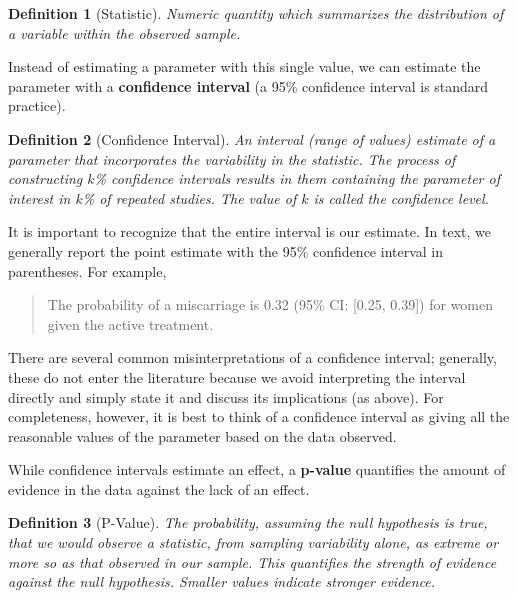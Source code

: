 \documentclass[
]{book}
\theoremstyle{plain}
\theoremstyle{mydefn}
\newtheorem{definition}{Definition}[chapter]
\theoremstyle{myexmpl}
\theoremstyle{remark}
\begin{document}
\begin{definition}[Statistic]
\protect\hypertarget{def:defn-statistic}{}{\label{def:defn-statistic} {} }Numeric quantity which summarizes the distribution of a variable within the observed \emph{sample}.
\end{definition}

Instead of estimating a parameter with this single value, we can estimate the parameter with a \textbf{confidence interval} (a 95\% confidence interval is standard practice).

\begin{definition}[Confidence Interval]
\protect\hypertarget{def:defn-confidence-interval}{}{\label{def:defn-confidence-interval} {} }An interval (range of values) estimate of a parameter that incorporates the variability in the statistic. The process of constructing \(k\)\% confidence intervals results in them containing the parameter of interest in \(k\)\% of repeated studies. The value of \(k\) is called the \emph{confidence level}.
\end{definition}

It is important to recognize that the entire interval is our estimate. In text, we generally report the point estimate with the 95\% confidence interval in parentheses. For example,

\begin{quote}
The probability of a miscarriage is 0.32 (95\% CI: {[}0.25, 0.39{]}) for women given the active treatment.
\end{quote}

There are several common misinterpretations of a confidence interval; generally, these do not enter the literature because we avoid interpreting the interval directly and simply state it and discuss its implications (as above). For completeness, however, it is best to think of a confidence interval as giving all the reasonable values of the parameter based on the data observed.

While confidence intervals estimate an effect, a \textbf{p-value} quantifies the amount of evidence in the data against the lack of an effect.

\begin{definition}[P-Value]
\protect\hypertarget{def:defn-pvalue}{}{\label{def:defn-pvalue} {} }The probability, assuming the null hypothesis is true, that we would observe a statistic, from sampling variability alone, as extreme or more so as that observed in our sample. This quantifies the strength of evidence against the null hypothesis. Smaller values indicate stronger evidence.
\end{definition}
\end{document}
